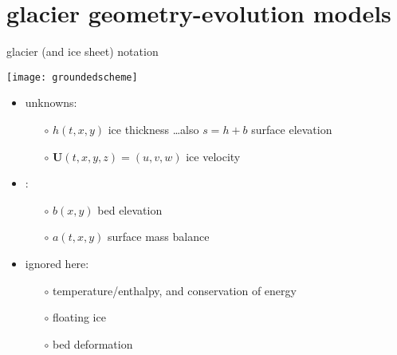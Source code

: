 \documentclass{beamer}
\newcommand\bU{\mathbf{U}}
\begin{document}

\section{glacier geometry-evolution models}

\begin{frame}{glacier (and ice sheet) notation}

\begin{center}
\texttt{[image: groundedscheme]}
\end{center}

\begin{itemize}
\item unknowns:
  \begin{itemize}
  \item[$\circ$]  $h(t,x,y)$ ice thickness \hfill \dots also $s=h+b$ surface elevation
  \item[$\circ$]  $\bU(t,x,y,z) = (u,v,w)$ ice velocity
  \end{itemize}
\item {}:
  \begin{itemize}
  \item[$\circ$]  $b(x,y)$ bed elevation 
  \item[$\circ$]  $a(t,x,y)$ surface mass balance   
  \end{itemize}
\item ignored here:
  \begin{itemize}
  \item[$\circ$]  temperature/enthalpy, and conservation of energy
  \item[$\circ$]  floating ice
  \item[$\circ$]  bed deformation
  \end{itemize}
\end{itemize}
\end{frame}
\end{document}
